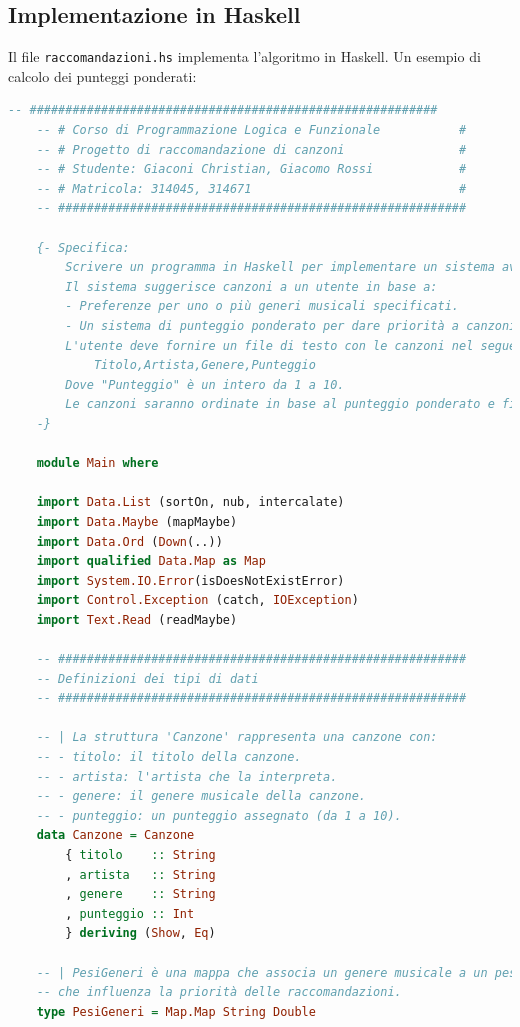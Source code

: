 \documentclass[a4paper,11pt]{article}
\begin{document}
\subsection{Implementazione in Haskell}
Il file \texttt{raccomandazioni.hs} implementa l'algoritmo in Haskell. Un esempio di calcolo dei punteggi ponderati:
\begin{lstlisting}[language=Haskell,caption=raccomandazioni.hs]
    -- #########################################################
    -- # Corso di Programmazione Logica e Funzionale           #
    -- # Progetto di raccomandazione di canzoni                #
    -- # Studente: Giaconi Christian, Giacomo Rossi            #
    -- # Matricola: 314045, 314671                             #
    -- #########################################################
    
    {- Specifica:
        Scrivere un programma in Haskell per implementare un sistema avanzato di raccomandazione di canzoni.
        Il sistema suggerisce canzoni a un utente in base a:
        - Preferenze per uno o più generi musicali specificati.
        - Un sistema di punteggio ponderato per dare priorità a canzoni più rilevanti.
        L'utente deve fornire un file di testo con le canzoni nel seguente formato:
            Titolo,Artista,Genere,Punteggio
        Dove "Punteggio" è un intero da 1 a 10.
        Le canzoni saranno ordinate in base al punteggio ponderato e filtrate per genere.
    -}
    
    module Main where
    
    import Data.List (sortOn, nub, intercalate)
    import Data.Maybe (mapMaybe)
    import Data.Ord (Down(..))
    import qualified Data.Map as Map
    import System.IO.Error(isDoesNotExistError)
    import Control.Exception (catch, IOException)
    import Text.Read (readMaybe)
    
    -- #########################################################
    -- Definizioni dei tipi di dati
    -- #########################################################
    
    -- | La struttura 'Canzone' rappresenta una canzone con:
    -- - titolo: il titolo della canzone.
    -- - artista: l'artista che la interpreta.
    -- - genere: il genere musicale della canzone.
    -- - punteggio: un punteggio assegnato (da 1 a 10).
    data Canzone = Canzone
        { titolo    :: String
        , artista   :: String
        , genere    :: String
        , punteggio :: Int
        } deriving (Show, Eq)
    
    -- | PesiGeneri è una mappa che associa un genere musicale a un peso
    -- che influenza la priorità delle raccomandazioni.
    type PesiGeneri = Map.Map String Double
    

\end{lstlisting}
\end{document}
